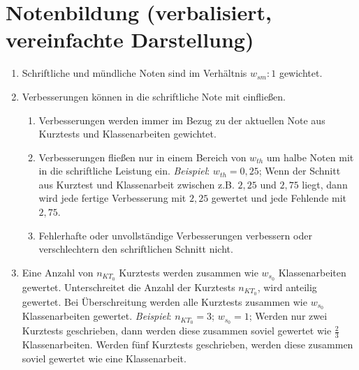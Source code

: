 \section{Notenbildung (verbalisiert, vereinfachte Darstellung)}\label{chap:A}

\begin{enumerate}[label=\textbf{\arabic*)}]
	\item Schriftliche und mündliche Noten sind im Verhältnis $w_{sm} : 1$ gewichtet.
	\item Verbesserungen können in die schriftliche Note mit einfließen.
	\begin{enumerate}[label=\textbf{(\alph*)}]
		\item Verbesserungen werden immer im Bezug zu der aktuellen Note aus Kurztests und Klassenarbeiten gewichtet.
		\item Verbesserungen fließen nur in einem Bereich von $w_{th}$ um halbe Noten mit in die schriftliche Leistung ein. \textit{Beispiel}: $w_{th}=0{,}25$; Wenn der Schnitt aus Kurztest und Klassenarbeit zwischen z.B. $2{,}25$ und $2{,}75$ liegt, dann wird jede fertige Verbesserung mit $2{,}25$ gewertet und jede Fehlende mit $2{,}75$.
		\item Fehlerhafte oder unvollständige Verbesserungen verbessern oder verschlechtern den schriftlichen Schnitt nicht.
	\end{enumerate}
	\item Eine Anzahl von $n_{KT_0}$ Kurztests werden zusammen wie $w_{s_0}$ Klassenarbeiten gewertet. Unterschreitet die Anzahl der Kurztests $n_{KT_0}$, wird anteilig gewertet. Bei Überschreitung werden alle Kurztests zusammen wie  $w_{s_0}$ Klassenarbeiten gewertet. \textit{Beispiel}:  $n_{KT_0} = 3$; $w_{s_0}=1$; Werden nur zwei Kurztests geschrieben, dann werden diese zusammen soviel gewertet wie $\frac{2}{3}$ Klassenarbeiten. Werden fünf Kurztests geschrieben, werden diese zusammen soviel gewertet wie eine Klassenarbeit.
\end{enumerate}


